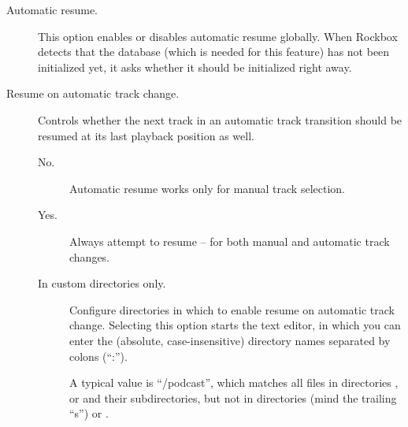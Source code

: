 \begin{description}
\item[Automatic resume.] This option enables or disables automatic
  resume globally.  When Rockbox detects that the database (which is
  needed for this feature) has not been initialized yet, it asks
  whether it should be initialized right away.

\item[Resume on automatic track change.] Controls whether the next
  track in an automatic track transition should be resumed at its last
  playback position as well.
  \begin{description}
  \item[No.] Automatic resume works only for manual track selection.
  \item[Yes.] Always attempt to resume -- for both manual and
    automatic track changes.
  \item[In custom directories only.] Configure directories in which to
    enable resume on automatic track change.  Selecting this option
    starts the text editor, in which you can enter the (absolute,
    case-insensitive) directory names separated by colons (``:'').

    A typical value is ``/podcast'', which matches all files in
    directories ,  or 
    and their subdirectories, but not in directories 
    (mind the trailing ``s'') or .
  \end{description}
\end{description}
